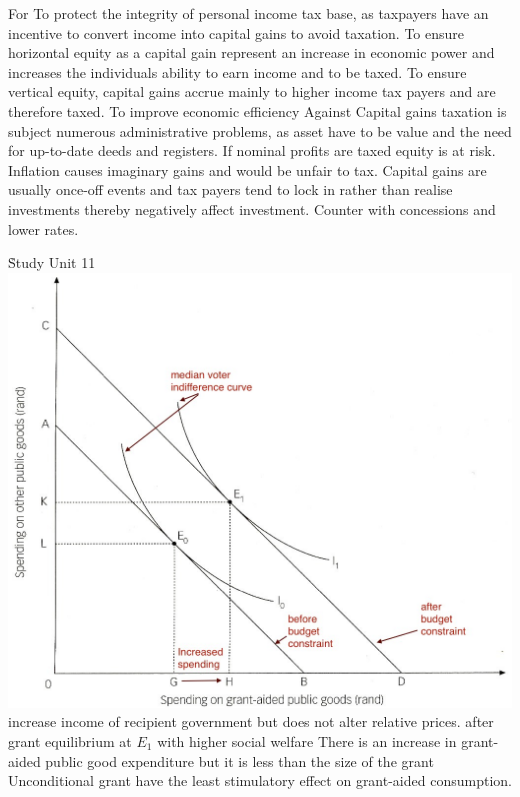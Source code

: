 \documentclass[12pt]{examnotes}
\begin{document}
\ra For
 To protect the integrity of personal income tax base, as taxpayers have an incentive to convert income into capital gains to avoid taxation.
 To ensure horizontal equity as a capital gain represent an increase in economic power and increases the individuals ability to earn income and to be taxed.
 To ensure vertical equity, capital gains accrue mainly to higher income tax payers and are therefore taxed.
 To improve economic efficiency
\ra Against
 Capital gains taxation is subject numerous  administrative problems, as asset have to be value and the need for up-to-date deeds and registers.
 If nominal profits are taxed equity is at risk. Inflation causes imaginary gains and would be unfair to tax.
 Capital gains are usually once-off events and tax payers tend to lock in rather than realise investments thereby negatively affect investment. Counter with concessions and lower rates.

\h{Study Unit 11}
\includegraphics[scale=0.3]{./imgs/171.jpg}
\ra increase income of recipient government but does not alter relative prices.
\ra after grant equilibrium at $E_1$ with higher social welfare
\ra There is an increase in grant-aided public good expenditure but it is less than the size of the grant
\ra Unconditional grant have the least stimulatory effect on grant-aided consumption.
\end{document}
